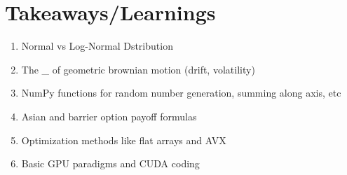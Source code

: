 \documentclass{article}
\begin{document}
\section*{Takeaways/Learnings}
\begin{enumerate}
    \item Normal vs Log-Normal Dstribution
    \item The \_ of geometric brownian motion (drift, volatility)
    \item NumPy functions for random number generation, summing along axis, etc
    \item Asian and barrier option payoff formulas
    \item Optimization methods like flat arrays and AVX
    \item Basic GPU paradigms and CUDA coding
\end{enumerate}
\end{document}
